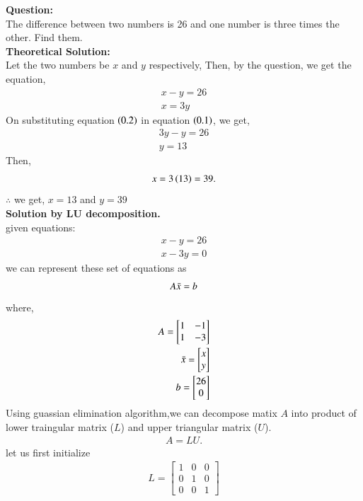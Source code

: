 \documentclass[journal]{IEEEtran}
\begin{document}
\textbf{Question:}
\\
The difference between two numbers is 26 and one number is three times the other. Find them.
\\
\textbf{ Theoretical Solution: }
\\
Let the two numbers be $x$ and $y$ respectively,
Then, by the question, we get the equation,
\begin{align} 
x - y = 26\\
x = 3y
\end{align}
On substituting equation $\left(0.2\right)$ in equation $\left(0.1\right)$, we get,
\begin{align}
    3y - y = 26\\
    y = 13
\end{align}
Then,
\begin{align}
    x = 3\left(13\right) = 39.
\end{align}
$\therefore$ we get, $x = 13$ and $y = 39$
\\
\textbf{Solution by LU decomposition.}
\\
 given equations:
 \begin{align}
     x - y = 26\\
     x - 3y = 0
 \end{align}
 we can represent these set of equations as
 \begin{align}
     A\Bar{x} = b
 \end{align}
 where,
 \begin{align}
     A = \begin{bmatrix}
         1 & -1\\
         1 & -3
     \end{bmatrix} \\
     \Bar{x} = \begin{bmatrix}
         x\\
         y
     \end{bmatrix} \\
     b = \begin{bmatrix}
         26\\
         0
     \end{bmatrix}
 \end{align}
 Using guassian elimination algorithm,we can decompose matix $A$ into product of lower traingular matrix ($L$) and upper triangular matrix ($U$).
 \begin{align}
     A = LU.
 \end{align}
 let us first initialize
 \begin{align}
     L = \begin{bmatrix}
         1&0&0\\
         0&1&0\\
         0&0&1
     \end{bmatrix}
 \end{align}
\end{document}
